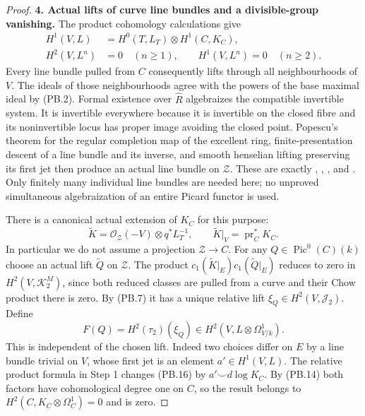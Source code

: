 \begin{proof}
\textbf{4. Actual lifts of curve line bundles and a divisible-group vanishing.}
The product cohomology calculations give
\[
 \begin{split}
 H^1(V,L)&=H^0(T,L_T)\otimes H^1(C,K_C),\\
 H^2(V,L^n)&=0\quad(n\ge1),\qquad
 H^1(V,L^n)=0\quad(n\ge2).
 \end{split}
 \tag{PB.14}
\]
Every line bundle pulled from $C$ consequently lifts through all
neighbourhoods of $V$. The ideals of those neighbourhoods agree with
the powers of the base maximal ideal by (PB.2). Formal existence
over $\widehat R$ algebraizes the compatible invertible system.
It is invertible everywhere because it is invertible on the closed
fibre and its noninvertible locus has proper image avoiding the
closed point. Popescu's theorem for the regular completion map of
the excellent ring, finite-presentation descent of a line bundle
and its inverse, and smooth henselian lifting preserving its first
jet then produce an actual line bundle on $\mathcal Z$.
These are exactly
\citet[Lemma 15.51.14, Tag 0AH2]{frC3azStacksCompletion},
\citet[Theorem 16.12.1, Tag 07GC]{frC3azStacksPopescu},
\citet[Lemma 32.10.3(2), Tag 0B8W]{frC3azStacksLimitBundles}, and
\citet[Lemma 15.13.3, Tag 0H74]{frC3azStacksHenselSmooth}.
Only finitely many individual line bundles are needed here; no
unproved simultaneous algebraization of an entire Picard functor
is used.

There is a canonical actual extension of $K_C$ for this purpose:
\[
 \widetilde K=\mathcal O_{\mathcal Z}(-V)\otimes q^*L_T^{-1},
 \qquad \widetilde K|_V=\operatorname{pr}_C^*K_C.
 \tag{PB.15}
\]
In particular we do not assume a projection $\mathcal Z\to C$.
For any $Q\in\operatorname{Pic}^0(C)(k)$ choose an actual lift
$\widetilde Q$ on $\mathcal Z$. The product
$c_1(\widetilde K|_E)c_1(\widetilde Q|_E)$ reduces to zero in
$H^2(V,\mathcal K_2^M)$, since both reduced classes are pulled from
a curve and their Chow product there is zero. By (PB.7) it has a
unique relative lift $\xi_Q\in H^2(V,\mathcal J_2)$.
Define
\[
 F(Q)=H^2(\tau_2)(\xi_Q)
                      \in H^2(V,L\otimes\Omega^1_{V/k}).
 \tag{PB.16}
\]
This is independent of the chosen lift. Indeed two choices differ
on $E$ by a line bundle trivial on $V$, whose first jet is an
element $a'\in H^1(V,L)$. The relative product formula in Step 1
changes (PB.16) by $a'\smile d\log K_C$. By (PB.14) both factors
have cohomological degree one on $C$, so the result belongs to
$H^2(C,K_C\otimes\Omega_C^1)=0$ and is zero.


\end{proof}
